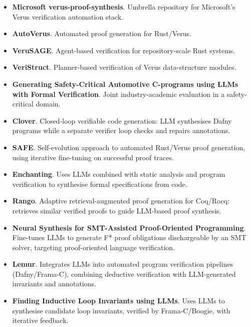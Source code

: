 \documentclass[natbib=false,acmsmall,nonacm,11pt]{acmart}
\begin{document}
\begin{itemize}
\item \textbf{Microsoft verus-proof-synthesis}. Umbrella repository for Microsoft's Verus verification automation stack.~\cite{microsoft_verus_proof_synthesis_repo}
\item \textbf{AutoVerus}. Automated proof generation for Rust/Verus.~\cite{DBLP:journals/pacmpl/YangLMYCGHLLL0Z25}
\item \textbf{VeruSAGE}. Agent-based verification for repository-scale Rust systems.~\cite{DBLP:journals/corr/abs-2512-18436}
\item \textbf{VeriStruct}. Planner-based verification of Verus data-structure modules.~\cite{DBLP:journals/corr/abs-2510-25015}
\item \textbf{Generating Safety-Critical Automotive C-programs using LLMs with Formal Verification}. Joint industry-academic evaluation in a safety-critical domain.~\cite{safety_critical_automotive_2025}
\item \textbf{Clover}. Closed-loop verifiable code generation: LLM synthesises Dafny programs while a separate verifier loop checks and repairs annotations.~\cite{DBLP:conf/saiv/SunSPB24}
\item \textbf{SAFE}. Self-evolution approach to automated Rust/Verus proof generation, using iterative fine-tuning on successful proof traces.~\cite{DBLP:journals/corr/abs-2410-15756}
\item \textbf{Enchanting}. Uses LLMs combined with static analysis and program verification to synthesise formal specifications from code.~\cite{DBLP:conf/cav/WenCSXQHLCT24}
\item \textbf{Rango}. Adaptive retrieval-augmented proof generation for Coq/Rocq: retrieves similar verified proofs to guide LLM-based proof synthesis.~\cite{DBLP:journals/corr/abs-2412-14063}
\item \textbf{Neural Synthesis for SMT-Assisted Proof-Oriented Programming}. Fine-tunes LLMs to generate F* proof obligations dischargeable by an SMT solver, targeting proof-oriented language verification.~\cite{DBLP:journals/corr/abs-2405-01787}
\item \textbf{Lemur}. Integrates LLMs into automated program verification pipelines (Dafny/Frama-C), combining deductive verification with LLM-generated invariants and annotations.~\cite{DBLP:journals/corr/abs-2310-04870}
\item \textbf{Finding Inductive Loop Invariants using LLMs}. Uses LLMs to synthesise candidate loop invariants, verified by Frama-C/Boogie, with iterative feedback.~\cite{DBLP:journals/corr/abs-2311-07948}

\end{itemize}
\end{document}
